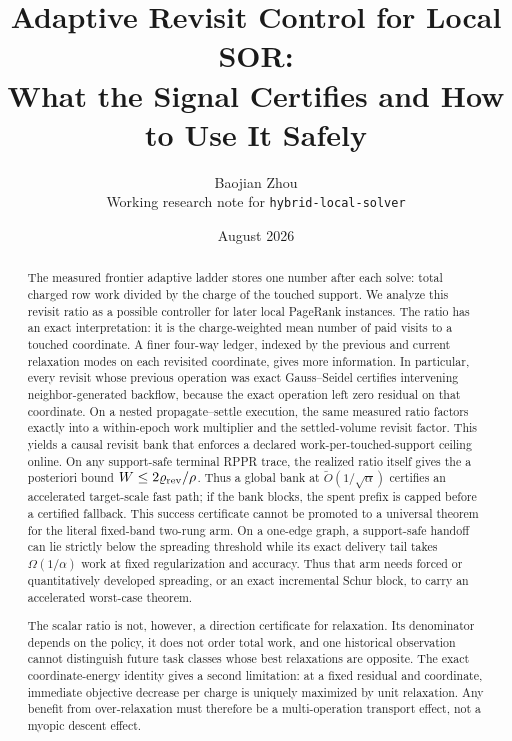\documentclass[11pt]{article}
\title{Adaptive Revisit Control for Local SOR:\\
What the Signal Certifies and How to Use It Safely}
\author{Baojian Zhou\\
\small Working research note for \texttt{hybrid-local-solver}}
\date{August 2026}
\begin{document}
\maketitle

\begin{abstract}
The measured frontier adaptive ladder stores one number after each solve:
total charged row work divided by the charge of the touched support.  We
analyze this revisit ratio as a possible controller for later local PageRank
instances.  The ratio has an exact interpretation: it is the
charge-weighted mean number of paid visits to a touched coordinate.  A finer
four-way ledger, indexed by the previous and current relaxation modes on each
revisited coordinate, gives more information.  In particular, every revisit
whose previous operation was exact Gauss--Seidel certifies intervening
neighbor-generated backflow, because the exact operation left zero residual
on that coordinate.  On a nested propagate--settle execution, the same
measured ratio factors exactly into a within-epoch work multiplier and the
settled-volume revisit factor.  This yields a causal revisit bank that
enforces a declared work-per-touched-support ceiling online.  On any
support-safe terminal RPPR trace, the realized ratio itself gives the
a posteriori bound $W\leq2\varrho_{\rm rev}/\rho$.  Thus a global bank at
$\widetilde O(1/\sqrt\alpha)$ certifies an accelerated target-scale fast path;
if the bank blocks, the spent prefix is capped before a certified fallback.
This success certificate cannot be promoted to a universal theorem for the
literal fixed-band two-rung arm.  On a one-edge graph, a support-safe handoff
can lie strictly below the spreading threshold while its exact delivery tail
takes $\Omega(1/\alpha)$ work at fixed regularization and accuracy.  Thus
that arm needs forced or quantitatively developed spreading, or an exact
incremental Schur block, to carry an accelerated worst-case theorem.

The scalar ratio is not, however, a direction certificate for relaxation.
Its denominator depends on the policy, it does not order total work, and one
historical observation cannot distinguish future task classes whose best
relaxations are opposite.  The exact coordinate-energy identity gives a
second limitation: at a fixed residual and coordinate, immediate objective
decrease per charge is uniquely maximized by unit relaxation.  Any benefit
from over-relaxation must therefore be a multi-operation transport effect,
not a myopic descent effect.


\end{abstract}
\end{document}
